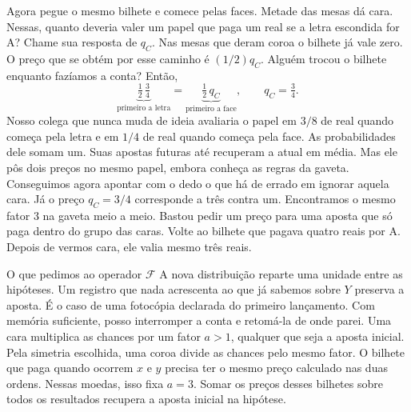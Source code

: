 Agora pegue o mesmo bilhete e comece pelas faces. Metade das mesas dá cara. Nessas, quanto deveria valer um papel que paga um real se a letra escondida for A? Chame sua resposta de $q_C$. Nas mesas que deram coroa o bilhete já vale zero. O preço que se obtém por esse caminho é $(1/2)q_C$. Alguém trocou o bilhete enquanto fazíamos a conta? Então,
\[
       \underbrace{\tfrac12\,\tfrac34}_{\text{primeiro a letra}}
       =\underbrace{\tfrac12\,q_C}_{\text{primeiro a face}},
       \qquad q_C=\tfrac34 .
\]
Nosso colega que nunca muda de ideia avaliaria o papel em $3/8$ de real quando começa pela letra e em $1/4$ de real quando começa pela face. As probabilidades dele somam um. Suas apostas futuras até recuperam a atual em média. Mas ele pôs dois preços no mesmo papel, embora conheça as regras da gaveta. Conseguimos agora apontar com o dedo o que há de errado em ignorar aquela cara. Já o preço $q_C=3/4$ corresponde a três contra um. Encontramos o mesmo fator 3 na gaveta meio a meio. Bastou pedir um preço para uma aposta que só paga dentro do grupo das caras. Volte ao bilhete que pagava quatro reais por A. Depois de vermos cara, ele valia mesmo três reais.

\begin{quadro}{O que pedimos ao operador \(\mathcal F\)}
 A nova distribuição reparte uma unidade entre as hipóteses. Um registro que nada acrescenta ao que já sabemos sobre $Y$ preserva a aposta. É o caso de uma fotocópia declarada do primeiro lançamento. Com memória suficiente, posso interromper a conta e retomá-la de onde parei.
 Uma cara multiplica as chances por um fator $a>1$, qualquer que seja a aposta inicial. Pela simetria escolhida, uma coroa divide as chances pelo mesmo fator.
 O bilhete que paga quando ocorrem $x$ e $y$ precisa ter o mesmo preço calculado nas duas ordens. Nessas moedas, isso fixa $a=3$. Somar os preços desses bilhetes sobre todos os resultados recupera a aposta inicial na hipótese.
\end{quadro}

